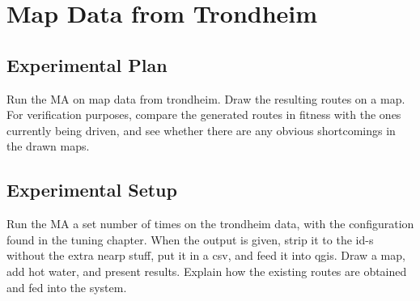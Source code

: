 {
\begin{table}[tbph]
\centering
{} %
\caption{The best result obtained from the MA and the known optimal solution for the BHW1 benchmark.}
\label{tab:BHW1_solutions_compared}
\end{table}
}

\section{Map Data from Trondheim}

\subsection{Experimental Plan}
Run the MA on map data from trondheim. Draw the resulting routes on a map. For verification purposes, compare the generated routes in fitness with the ones currently being driven, and see whether there are any obvious shortcomings in the drawn maps.

\subsection{Experimental Setup}
Run the MA a set number of times on the trondheim data, with the configuration found in the tuning chapter. When the output is given, strip it to the id-s without the extra nearp stuff, put it in a csv, and feed it into qgis. Draw a map, add hot water, and present results.
Explain how the existing routes are obtained and fed into the system.

